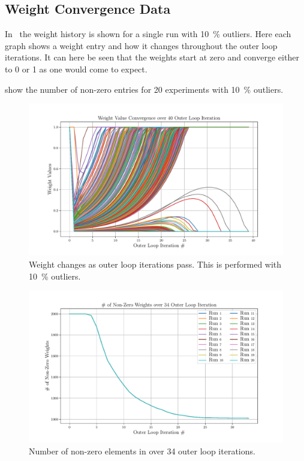 \newpage
\subsection{Weight Convergence Data}\label{sec:weight-convergence-data}

In~ the weight history is shown for a single run with \SI{10}{\percent} outliers. Here each graph shows a weight entry and how it changes throughout the outer loop iterations. It can here be seen that the weights start at zero and converge either to \num{0} or \num{1} as one would come to expect.\medskip

 show the number of non-zero entries for \num{20} experiments with \SI{10}{\percent} outliers.

\begin{figure}[!h]
	\begin{center}
		\includegraphics[width=\textwidth]{chapters/2-pose-estimation/fig/GNC-TLS-w-history-conv.pdf}
	\end{center}
	\caption{Weight changes as outer loop iterations pass. This is performed with \SI{10}{\percent} outliers.}
	\label{fig:GNC-TLS-w-history-conv}
\end{figure}

\begin{figure}[!h]
	\begin{center}
		\includegraphics[width=\textwidth]{chapters/2-pose-estimation/fig/GNC-TLS-w-run-10-conv.pdf}
	\end{center}
	\caption{Number of non-zero elements in \vec{\omega} over \num{34} outer loop iterations.}
	\label{fig:GNC-TLS-w-run-conv}
\end{figure}

